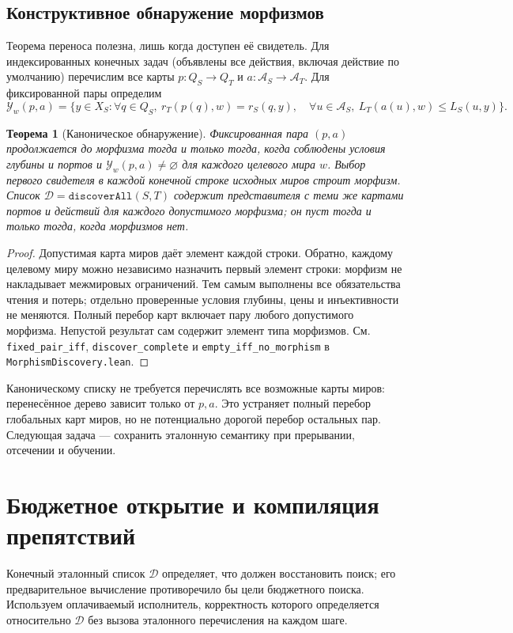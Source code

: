 \documentclass[10pt,a4paper]{article}
\newtheorem{theorem}{Теорема}[section]
\newcommand{\CanonRef}{\mathcal D}
\newcommand{\rc}[1]{\allowbreak\texttt{#1}\allowbreak}
\begin{document}
\subsection{Конструктивное обнаружение морфизмов}
Теорема переноса полезна, лишь когда доступен её свидетель. Для индексированных конечных задач (объявлены все действия, включая действие по умолчанию) перечислим все карты $p:Q_S\to Q_T$ и $a:\mathcal A_S\to\mathcal A_T$. Для фиксированной пары определим
\[
 \mathcal Y_w(p,a)=\{y\in X_S: \forall q\in Q_S,\ r_T(p(q),w)=r_S(q,y),\quad
 \forall u\in\mathcal A_S,\ L_T(a(u),w)\le L_S(u,y)\}.
\]
\begin{theorem}[Каноническое обнаружение]\label{thm:discovery}
Фиксированная пара $(p,a)$ продолжается до морфизма тогда и только тогда, когда соблюдены условия глубины и портов и $\mathcal Y_w(p,a)\ne\varnothing$ для каждого целевого мира $w$. Выбор первого свидетеля в каждой конечной строке исходных миров строит морфизм. Список $\CanonRef=\rc{discoverAll}(S,T)$ содержит представителя с теми же картами портов и действий для каждого допустимого морфизма; он пуст тогда и только тогда, когда морфизмов нет.
\end{theorem}
\begin{proof}
Допустимая карта миров даёт элемент каждой строки. Обратно, каждому целевому миру можно независимо назначить первый элемент строки: морфизм не накладывает межмировых ограничений. Тем самым выполнены все обязательства чтения и потерь; отдельно проверенные условия глубины, цены и инъективности не меняются. Полный перебор карт включает пару любого допустимого морфизма. Непустой результат сам содержит элемент типа морфизмов. См. \rc{fixed\_pair\_iff}, \rc{discover\_complete} и \rc{empty\_iff\_no\_morphism} в \rc{MorphismDiscovery.lean}.
\end{proof}
Каноническому списку не требуется перечислять все возможные карты миров: перенесённое дерево зависит только от $p,a$. Это устраняет полный перебор глобальных карт миров, но не потенциально дорогой перебор остальных пар. Следующая задача --- сохранить эталонную семантику при прерывании, отсечении и обучении.
\clearpage
\section{Бюджетное открытие и компиляция препятствий}\label{sec:obstruction}
Конечный эталонный список $\CanonRef$ определяет, что должен восстановить поиск; его предварительное вычисление противоречило бы цели бюджетного поиска. Используем оплачиваемый исполнитель, корректность которого определяется относительно $\CanonRef$ без вызова эталонного перечисления на каждом шаге.
\end{document}
